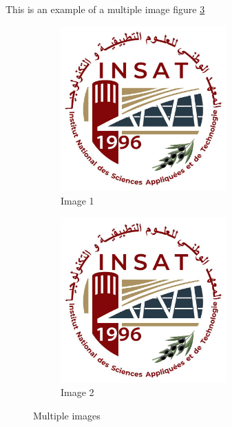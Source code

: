         This is an example of a multiple image figure \ref{img:multiple}
        
        \begin{figure}[htbp]
        \begin{subfigure}[t]{0.5\linewidth}
        \centering
        \includegraphics[width=0.7\textwidth]{images/INSAT.jpg}
        \caption{Image 1}
        \label{subfig:img1}
        \end{subfigure}%
        \begin{subfigure}[t]{0.5\linewidth}
        \centering
        \includegraphics[width=0.7\textwidth]{images/INSAT.jpg}
        \caption{Image 2}
        \label{subfig:img2}
        \end{subfigure}
        \caption{Multiple images}
        \label{img:multiple}
        \end{figure}
        
